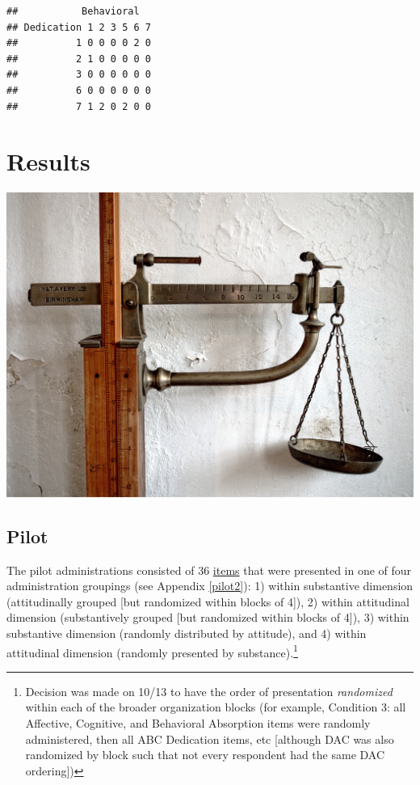 \documentclass[
]{book}
\begin{document}
\begin{verbatim}
##           Behavioral
## Dedication 1 2 3 5 6 7
##          1 0 0 0 0 2 0
##          2 1 0 0 0 0 0
##          3 0 0 0 0 0 0
##          6 0 0 0 0 0 0
##          7 1 2 0 2 0 0
\end{verbatim}

\hypertarget{results}{%
\chapter{Results}\label{results}}

\includegraphics{results.jpg}

\hypertarget{pilot}{%
\section{Pilot}\label{pilot}}

The pilot administrations consisted of 36 \href{https://docs.google.com/document/d/18KYE7jq8XLhN-mfGQRMnkf5AM-_U2CJck50eISbAiwM/edit?usp=sharing}{items} that were presented in one of four administration groupings (see Appendix \ref{pilot2}): 1) within substantive dimension (attitudinally grouped {[}but randomized within blocks of 4{]}), 2) within attitudinal dimension (substantively grouped {[}but randomized within blocks of 4{]}), 3) within substantive dimension (randomly distributed by attitude), and 4) within attitudinal dimension (randomly presented by substance).\footnote{Decision was made on 10/13 to have the order of presentation \emph{randomized} within each of the broader organization blocks (for example, Condition 3: all Affective, Cognitive, and Behavioral Absorption items were randomly administered, then all ABC Dedication items, etc {[}although DAC was also randomized by block such that not every respondent had the same DAC ordering{]})}
\end{document}
